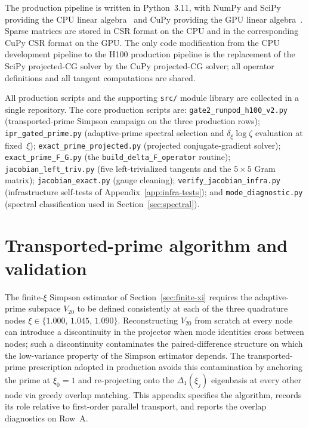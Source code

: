 \documentclass[a4paper,11pt]{article}
\theoremstyle{definition}
\begin{document}
The production pipeline is written in Python~3.11, with NumPy and SciPy
providing the CPU linear algebra~\cite{Harris2020,Virtanen2020}
and CuPy providing the GPU linear algebra~\cite{Okuta2017}.
Sparse matrices are stored in CSR format on the CPU and in the
corresponding CuPy CSR format on the GPU. The only code modification from
the CPU development pipeline to the H100 production pipeline is the
replacement of the SciPy projected-CG solver by the CuPy projected-CG
solver; all operator definitions and all tangent computations are shared.

All production scripts and the supporting \texttt{src/} module
library are collected in a single repository. The core production
scripts are: \texttt{gate2\_runpod\_h100\_v2.py} (transported-prime
Simpson campaign on the three production rows);
\texttt{ipr\_gated\_prime.py} (adaptive-prime spectral selection
and $\delta_\xi \log\zeta$ evaluation at fixed~$\xi$);
\texttt{exact\_prime\_projected.py} (projected conjugate-gradient
solver); \texttt{exact\_prime\_F\_G.py} (the
\texttt{build\_delta\_F\_operator} routine);
\texttt{jacobian\_left\_triv.py} (five left-trivialized tangents
and the $5 \times 5$ Gram matrix);
\texttt{jacobian\_exact.py} (gauge cleaning);
\texttt{verify\_jacobian\_infra.py} (infrastructure self-tests
of Appendix~\ref{app:infra-tests}); and
\texttt{mode\_diagnostic.py} (spectral classification used in
Section~\ref{sec:spectral}).



\section{Transported-prime algorithm and validation}
\label{app:transported-prime}

The finite-$\xi$ Simpson estimator of Section~\ref{sec:finite-xi} requires
the adaptive-prime subspace $V_{20}$ to be defined consistently at each of
the three quadrature nodes $\xi \in \{1.000,\,1.045,\,1.090\}$.
Reconstructing $V_{20}$ from scratch at every node can introduce a
discontinuity in the projector when mode identities cross between nodes;
such a discontinuity contaminates the paired-difference structure on which
the low-variance property of the Simpson estimator depends. The
transported-prime prescription adopted in production avoids this
contamination by anchoring the prime at $\xi_0 = 1$ and re-projecting onto
the $\Delta_1(\xi_j)$ eigenbasis at every other node via greedy overlap
matching. This appendix specifies the algorithm, records its role
relative to first-order parallel transport, and reports the overlap
diagnostics on Row~A.
\end{document}
